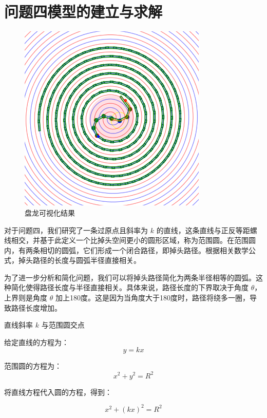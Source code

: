 \documentclass[withoutpreface, bwprint]{cumcmthesis} %
\begin{document}
\section{问题四模型的建立与求解}

\begin{figure}[!h]
    \centering
    \includegraphics[width=0.8\textwidth]{figures/turnaround.png}
    \caption{盘龙可视化结果}
\end{figure}


对于问题四，我们研究了一条过原点且斜率为 $ k $ 的直线，这条直线与正反等距螺线相交，并基于此定义一个比掉头空间更小的圆形区域，称为范围圆。在范围圆内，有两条相切的圆弧，它们形成一个闭合路径，即掉头路径。根据相关数学公式，掉头路径的长度与圆弧半径直接相关。

为了进一步分析和简化问题，我们可以将掉头路径简化为两条半径相等的圆弧。这种简化使得路径长度与半径直接相关。具体来说，路径长度的下界取决于角度 $ \theta $，上界则是角度 $ \theta $ 加上180度。这是因为当角度大于180度时，路径将绕多一圈，导致路径长度增加。

直线斜率 $ k $ 与范围圆交点

给定直线的方程为：
\begin{equation}
    y = kx
\end{equation}

范围圆的方程为：
\begin{equation}
    x^2 + y^2 = R^2
\end{equation}

将直线方程代入圆的方程，得到：

\begin{equation}
    x^2 + (kx)^2 = R^2
\end{equation}
\end{document}
